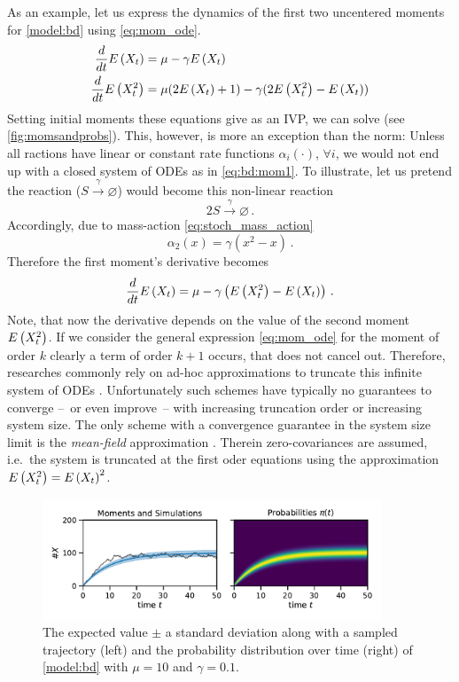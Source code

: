 As an example, let us express the dynamics of the first two uncentered moments for \autoref{model:bd} using \eqref{eq:mom_ode}.
\begin{equation}\label{eq:bd:mom1}
	\begin{split}
	\frac{d}{dt}\E{X_t} =\; &\mu - \gamma \E{X_t}\\
	\frac{d}{dt}\E{X_t^2} =\; &\mu(2\E{X_t} + 1) - \gamma (2\E{X_t^2}-\E{X_t})%
	\end{split}
\end{equation}
Setting initial moments these equations give as an \ac{IVP}, we can solve (see \autoref{fig:momsandprobs}).
This, however, is more an exception than the norm:
Unless all ractions have linear or constant rate functions $\alpha_i(\cdot)$, $\forall i$, we would not end up with a closed system of \acp{ODE} as in \eqref{eq:bd:mom1}.
To illustrate, let us pretend the reaction ($S\xrightarrow{\gamma}\varnothing$) would become this non-linear reaction
$$
2S\xrightarrow{\gamma}\varnothing\,.
$$
Accordingly, due to mass-action \eqref{eq:stoch_mass_action}
$$
\alpha_2(x)=\gamma (x^2 - x)\,.
$$
Therefore the first moment's derivative becomes
$$
\frac{d}{dt}{E}\left(X_t\right) =\mu - \gamma \left({E}\left(X_t^2\right) - {E}\left(X_t\right)\right)\,.
$$
Note, that now the derivative depends on the value of the second moment ${E}\left(X_t^2\right)$.
If we consider the general expression \eqref{eq:mom_ode} for the moment of order $k$ clearly a term of order $k+1$ occurs, that does not cancel out.
Therefore, researches commonly rely on ad-hoc approximations to truncate this infinite system of \acp{ODE} \cite{hespanha2008moment,schnoerr2015comparison,schnoerr2014validity}.
Unfortunately such schemes have typically no guarantees to converge --~or even improve~-- with increasing truncation order \cite{schnoerr2014validity} or increasing system size.
The only scheme with a convergence guarantee in the system size limit is the \emph{mean-field} approximation \cite{bortolussi2013continuous}.
Therein zero-covariances are assumed, i.e.\ the system is truncated at the first oder equations using the approximation ${E}\left(X_t^2\right)={E}\left(X_t\right)^2$.
\begin{figure}[htb]
	\centering
	\includegraphics[width=0.9\textwidth]{gfx/momsandprobs.pdf}
	\caption[Moments and probability distribution $\pi(t)$]{\label{fig:momsandprobs}The expected value $\pm$ a standard deviation along with a sampled trajectory (left) and the probability distribution over time (right) of \autoref{model:bd} with $\mu=10$ and $\gamma=0.1$.}
\end{figure}

